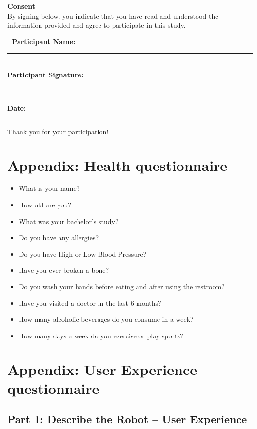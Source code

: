 \documentclass[runningheads]{llncs}
\begin{document}
\noindent
\textbf{Consent} \\
By signing below, you indicate that you have read and understood the information provided and agree to participate in this study.

\noindent
\begin{tabbing}
\hspace{4cm} \= \hspace{5cm} \= \kill
\textbf{Participant Name:} \> \rule{5cm}{0.4pt} \\
\textbf{Participant Signature:} \> \rule{5cm}{0.4pt} \\
\textbf{Date:} \> \rule{5cm}{0.4pt}
\end{tabbing}

\vspace{2em}

\noindent
Thank you for your participation!


\section{Appendix: Health questionnaire}\label{Appendix B: Health questionnaire}
\begin{itemize}
        \item What is your name?
        \item How old are you?
        \item What was your bachelor's study?
        \item Do you have any allergies?
        \item Do you have High or Low Blood Pressure?
        \item Have you ever broken a bone?
        \item Do you wash your hands before eating and after using the restroom?
        \item Have you visited a doctor in the last 6 months?
        \item How many alcoholic beverages do you consume in a week?
        \item How many days a week do you exercise or play sports?
    \end{itemize}



\section{Appendix: User Experience questionnaire}\label{Appendix C: User Experience questionnaire}

\subsection*{Part 1: Describe the Robot – User Experience}
\end{document}
